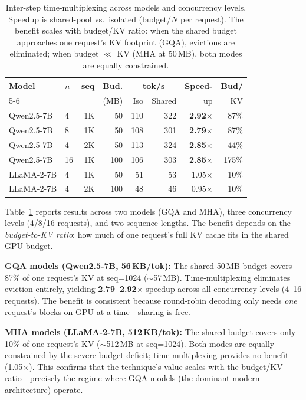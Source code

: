 \documentclass[conference]{IEEEtran}
\begin{document}
\begin{table}[t]
\centering
\caption{Inter-step time-multiplexing across models and concurrency levels. Speedup is shared-pool vs.\ isolated (budget/$N$ per request). The benefit scales with budget/KV ratio: when the shared budget approaches one request's KV footprint (GQA), evictions are eliminated; when budget $\ll$ KV (MHA at 50\,MB), both modes are equally constrained.}
\label{tab:time-multiplex}
\small
\setlength{\tabcolsep}{4pt}
\begin{tabular}{@{}llrrrrrr@{}}
\toprule
Model & $n$ & seq & Bud. & \multicolumn{2}{c}{tok/s} & Speed- & Bud/ \\
\cmidrule(lr){5-6}
 & & & (MB) & Iso & Shared & up & KV \\
\midrule
Qwen2.5-7B  & 4  & 1K & 50  & 110 & 322 & \textbf{2.92$\times$} & 87\% \\
Qwen2.5-7B  & 8  & 1K & 50  & 108 & 301 & \textbf{2.79$\times$} & 87\% \\
Qwen2.5-7B  & 4  & 2K & 50  & 113 & 324 & \textbf{2.85$\times$} & 44\% \\
Qwen2.5-7B  & 16 & 1K & 100 & 106 & 303 & \textbf{2.85$\times$} & 175\% \\
\midrule
LLaMA-2-7B  & 4  & 1K & 50  & 51  & 53  & 1.05$\times$ & 10\% \\
LLaMA-2-7B  & 4  & 2K & 100 & 48  & 46  & 0.95$\times$ & 10\% \\
\bottomrule
\end{tabular}
\end{table}

Table~\ref{tab:time-multiplex} reports results across two models (GQA and MHA), three concurrency levels (4/8/16 requests), and two sequence lengths. The benefit depends on the \emph{budget-to-KV ratio}: how much of one request's full KV cache fits in the shared GPU budget.

\textbf{GQA models (Qwen2.5-7B, 56\,KB/tok):} The shared 50\,MB budget covers 87\% of one request's KV at seq=1024 (${\sim}$57\,MB). Time-multiplexing eliminates eviction entirely, yielding \textbf{2.79--2.92$\times$} speedup across all concurrency levels (4--16 requests). The benefit is consistent because round-robin decoding only needs \emph{one} request's blocks on GPU at a time---sharing is free.

\textbf{MHA models (LLaMA-2-7B, 512\,KB/tok):} The shared budget covers only 10\% of one request's KV (${\sim}$512\,MB at seq=1024). Both modes are equally constrained by the severe budget deficit; time-multiplexing provides no benefit (1.05$\times$). This confirms that the technique's value scales with the budget/KV ratio---precisely the regime where GQA models (the dominant modern architecture) operate.
\end{document}
